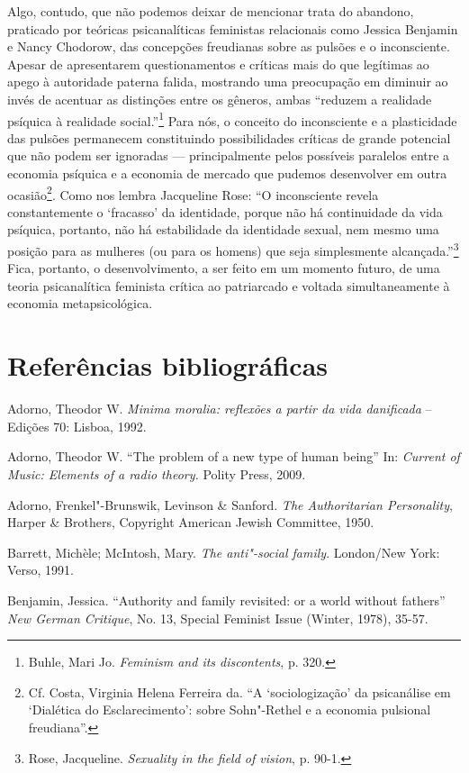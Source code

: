 Algo, contudo, que não podemos deixar de mencionar trata do abandono,
praticado por teóricas psicanalíticas feministas relacionais como
Jessica Benjamin e Nancy Chodorow, das concepções freudianas sobre as
pulsões e o inconsciente. Apesar de apresentarem questionamentos e
críticas mais do que legítimas ao apego à autoridade paterna falida,
mostrando uma preocupação em diminuir ao invés de acentuar as distinções
entre os gêneros, ambas ``reduzem a realidade psíquica à realidade
social.''\footnote{Buhle, Mari Jo. \emph{Feminism and its discontents},
  p. 320.} Para nós, o conceito do inconsciente e a plasticidade das
pulsões permanecem constituindo possibilidades críticas de grande
potencial que não podem ser ignoradas --- principalmente pelos possíveis
paralelos entre a economia psíquica e a economia de mercado que pudemos
desenvolver em outra ocasião\footnote{Cf. Costa, Virginia Helena
  Ferreira da. ``A `sociologização' da psicanálise em `Dialética do
  Esclarecimento': sobre Sohn"-Rethel e a economia pulsional freudiana''.}.
Como nos lembra Jacqueline Rose: ``O inconsciente revela constantemente
o `fracasso' da identidade, porque não há continuidade da vida psíquica,
portanto, não há estabilidade da identidade sexual, nem mesmo uma
posição para as mulheres (ou para os homens) que seja simplesmente
alcançada.''\footnote{Rose, Jacqueline. \emph{Sexuality in the field of
  vision}, p. 90-1.} Fica, portanto, o desenvolvimento, a ser feito em
um momento futuro, de uma teoria psicanalítica feminista crítica ao
patriarcado e voltada simultaneamente à economia metapsicológica.

\section{Referências bibliográficas}

Adorno, Theodor W. \emph{Minima
moralia: reflexões a partir da vida danificada} -- Edições 70: Lisboa,
1992.

Adorno, Theodor W. ``The problem of a new type of human being'' In:
\emph{Current of Music: Elements of a radio theory.} Polity Press, 2009.

Adorno, Frenkel"-Brunswik, Levinson \& Sanford. \emph{The Authoritarian
Personality}, Harper \& Brothers, Copyright American Jewish Committee,
1950.

Barrett, Michèle; McIntosh, Mary. \emph{The anti"-social family}.
London/New York: Verso, 1991.

Benjamin, Jessica. ``Authority and family revisited: or a world
without fathers'' \emph{New German Critique}, No. 13, Special Feminist
Issue (Winter, 1978), 35-57.

